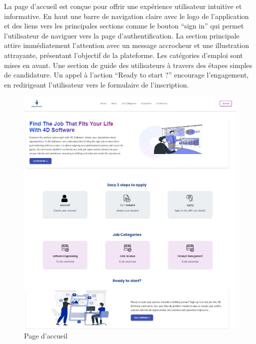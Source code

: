 La page  d’accueil est  conçue pour offrir une expérience utilisateur intuitive et informative. En haut une  barre  de navigation claire avec le logo de l’application et des liens vers les principales sections comme le bouton “sign in” qui permet l’utilisateur de  naviguer vers la page d’authentification. La section principale attire immédiatement l’attention avec un message accrocheur et une illustration attrayante, présentant l'objectif de la  plateforme. Les catégories d’emploi sont mises en  avant. Une section de guide des utilisateurs à travers des étapes simples de candidature. Un appel à l’action “Ready to start ?”  encourage l'engagement, en  redirigeant l’utilisateur vers le formulaire de  l’inscription. 
\begin{figure}[htbp]
   \centering
   \includegraphics[scale=0.7]{screens/accueil2.jpg} 
   \caption{Page d'accueil}
   \label{fig:accueil}
\end{figure}

\vspace{2cm}
